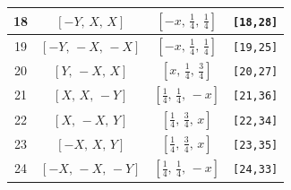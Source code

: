 \documentclass[fleqn,8pt]{jsarticle}
\begin{document}
\begin{longtable}{cccc}
18 & $\left[ - Y,\, X,\, X \right]$ & $\left[ - x,\, \frac{1}{4},\, \frac{1}{4} \right]$ & {\tt [18,28]} \\ \hline
19 & $\left[ - Y,\, - X,\, - X \right]$ & $\left[ - x,\, \frac{1}{4},\, \frac{1}{4} \right]$ & {\tt [19,25]} \\ \hline
20 & $\left[ Y,\, - X,\, X \right]$ & $\left[ x,\, \frac{1}{4},\, \frac{3}{4} \right]$ & {\tt [20,27]} \\ \hline
21 & $\left[ X,\, X,\, - Y \right]$ & $\left[ \frac{1}{4},\, \frac{1}{4},\, - x \right]$ & {\tt [21,36]} \\ \hline
22 & $\left[ X,\, - X,\, Y \right]$ & $\left[ \frac{1}{4},\, \frac{3}{4},\, x \right]$ & {\tt [22,34]} \\ \hline
23 & $\left[ - X,\, X,\, Y \right]$ & $\left[ \frac{1}{4},\, \frac{3}{4},\, x \right]$ & {\tt [23,35]} \\ \hline
24 & $\left[ - X,\, - X,\, - Y \right]$ & $\left[ \frac{1}{4},\, \frac{1}{4},\, - x \right]$ & {\tt [24,33]} \\
\end{longtable}
\renewcommand{\arraystretch}{1.2}
\end{document}
